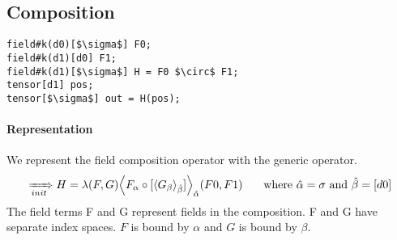 
  \subsection{Composition}
\begin{lstlisting}
field#k(d0)[$\sigma$] F0;
field#k(d1)[d0] F1;
field#k(d1)[$\sigma$] H = F0 $\circ$ F1; 
tensor[d1] pos;
tensor[$\sigma$] out = H(pos);
\end{lstlisting}

\paragraph{Representation}
We represent the field composition operator with the generic \name{} operator.
$$\rewriteInitA  H= \lambda(F,G) \EinExp{\expComp{F_\alpha}{G_\beta}{\beta}}{\hat{\alpha}}(F0,F1) \indent\text{ where } \hat{\alpha}=\sigma \text{ and } \hat{\beta} =[d0]$$
The field terms F and G represent fields in the composition.
F and G have separate index spaces. $F$ is bound by $\alpha$ and $G$ is bound by $\beta$.\\
 

